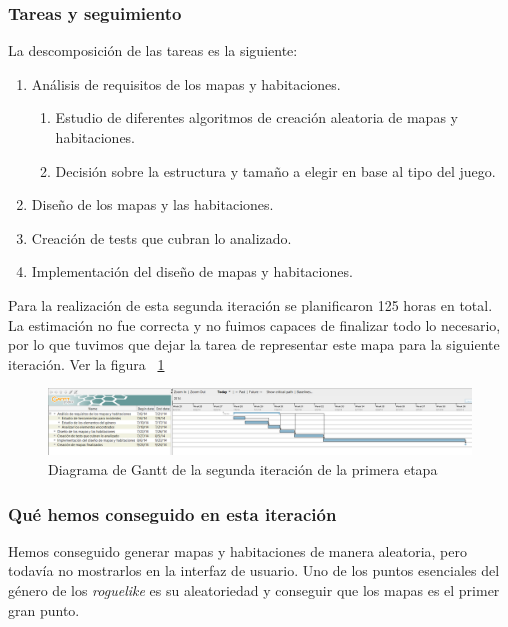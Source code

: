 \subsubsection{Tareas y seguimiento}

La descomposición de las tareas es la siguiente:

\begin{enumerate}[label=\bfseries WBS 2.\arabic*]
  \item Análisis de requisitos de los mapas y habitaciones.
    \begin{enumerate}[label=\bfseries WBS 2.1.\arabic*]
      \item Estudio de diferentes algoritmos de creación aleatoria de mapas y habitaciones.
      \item Decisión sobre la estructura y tamaño a elegir en base al tipo del juego.
    \end{enumerate}
  \item Diseño de los mapas y las habitaciones.
  \item Creación de tests que cubran lo analizado.
  \item Implementación del diseño de mapas y habitaciones.
\end{enumerate}

Para la realización de esta segunda iteración se planificaron 125 horas en total. La estimación no fue correcta y no fuimos capaces de finalizar todo lo necesario, por lo que tuvimos que dejar la tarea de representar este mapa para la siguiente iteración. Ver la figura ~\ref{fig:sec1it2}

\begin{figure}
    \includegraphics[width=\textwidth,height=\textheight,keepaspectratio]{./img/sec1it2.png}
  \caption{Diagrama de Gantt de la segunda iteración de la primera etapa}
  \label{fig:sec1it2}
\end{figure}

\subsubsection{Qué hemos conseguido en esta iteración}

Hemos conseguido generar mapas y habitaciones de manera aleatoria, pero todavía no mostrarlos en la interfaz de usuario. Uno de los puntos esenciales del género de los \textit{roguelike} es su aleatoriedad y conseguir que los mapas es el primer gran punto.

